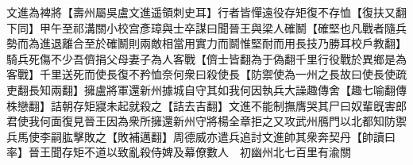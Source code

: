 文進為裨將【壽州屬吳盧文進遥領刺史耳】行者皆憚遠役存矩復不存恤【復扶又翻下同】甲午至祁溝關小校宫彥璋與士卒謀曰聞晉王與梁人確鬭【確堅也凡戰者隨兵勢而為進退離合至於確鬭則兩敵相當用實力而鬬惟堅耐而用長技乃勝耳校戶教翻】騎兵死傷不少吾儕捐父母妻子為人客戰【儕士皆翻為于偽翻千里行役戰於異鄉是為客戰】千里送死而使長復不矜恤奈何衆曰殺使長【防禦使為一州之長故曰使長使疏吏翻長知兩翻】擁盧將軍還新州據城自守其如我何因執兵大譟趣傳舍【趣七喻翻傳株戀翻】詰朝存矩寢未起就殺之【詰去吉翻】文進不能制撫膺哭其尸曰奴輩旣害郎君使我何面復見晉王因為衆所擁還新州守將楊全章拒之又攻武州鴈門以北都知防禦兵馬使李嗣肱擊敗之【敗補邁翻】周德威亦遣兵追討文進帥其衆奔契丹【帥讀曰率】晉王聞存矩不道以致亂殺侍婢及幕僚數人　初幽州北七百里有渝關